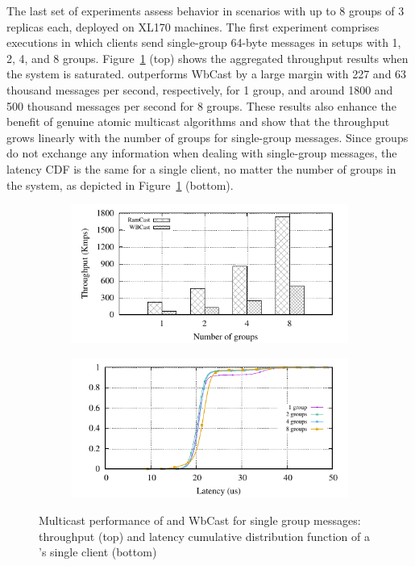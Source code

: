 The last set of experiments assess \libname behavior in scenarios with up to 8 groups of 3 replicas each, deployed on XL170 machines.
The first experiment comprises executions in which clients send single-group 64-byte messages in setups with 1, 2, 4, and 8 groups.
Figure~\ref{fig:multicast-single-group} (top) shows the aggregated throughput results when the system is saturated. 
\libname outperforms WbCast by a large margin with 227  and 63 thousand messages per second, respectively, for 1 group, and around 1800 and 500 thousand messages per second for 8 groups.
These results also enhance the benefit of genuine atomic multicast algorithms and show that the throughput grows linearly with the number of groups for single-group messages. 
Since groups do not exchange any information when dealing with single-group messages, the latency CDF is the same for a single client, no matter the number of groups in the system, as depicted in Figure~\ref{fig:multicast-single-group} (bottom).

\begin{figure}[htp!]
  \begin{subfigure}{\columnwidth}
    \centering
    \includegraphics[width=0.99\columnwidth]{figures/benchmark/graphs/figure-genuine-compare-throughput}
  \end{subfigure}
  \begin{subfigure}{\columnwidth}
    \centering
    \includegraphics[width=0.95\columnwidth]{figures/benchmark/graphs/figure-genuine-compare-latency-cdf}
  \end{subfigure}
  \caption{Multicast performance of \libname and WbCast for single group messages: throughput (top) and latency cumulative distribution function of a \libname's single client (bottom)}
  \label{fig:multicast-single-group}
\end{figure}

